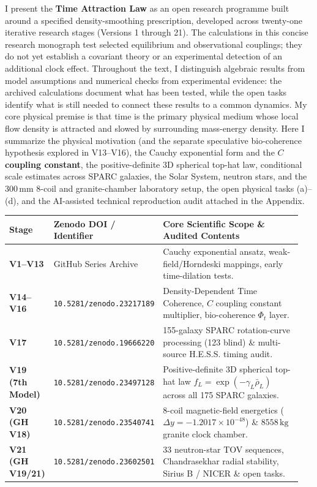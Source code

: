 \documentclass[10pt,a4paper]{article}
\begin{document}
{\small{}\par
I present the \textbf{Time Attraction Law} as an open research programme built around a specified density-smoothing prescription, developed across twenty-one iterative research stages (Versions 1 through 21). The calculations in this concise research monograph test selected equilibrium and observational couplings; they do not yet establish a covariant theory or an experimental detection of an additional clock effect. Throughout the text, I distinguish algebraic results from model assumptions and numerical checks from experimental evidence: the archived calculations document what has been tested, while the open tasks identify what is still needed to connect these results to a common dynamics. My core physical premise is that time is the primary physical medium whose local flow density is attracted and slowed by surrounding mass-energy density. Here I summarize the physical motivation (and the separate speculative bio-coherence hypothesis explored in V13--V16), the Cauchy exponential form and the \textbf{$C$ coupling constant}, the positive-definite 3D spherical top-hat law, conditional scale estimates across SPARC galaxies, the Solar System, neutron stars, and the $300\,\text{mm}$ 8-coil and granite-chamber laboratory setup, the open physical tasks (a)--(d), and the AI-assisted technical reproduction audit attached in the Appendix.

\vspace{1.5mm}
\begin{center}\vspace{-2pt}
{\footnotesize
\begin{tabular}{@{}>{\bfseries}p{0.15\linewidth}p{0.27\linewidth}p{0.53\linewidth}@{}}
\toprule
Stage & Zenodo DOI / Identifier & Core Scientific Scope \& Audited Contents \\
\midrule
V1--V13 & GitHub Series Archive & Cauchy exponential ansatz, weak-field/Horndeski mappings, early time-dilation tests. \\
V14--V16 & \texttt{10.5281/zenodo.23217189} & Density-Dependent Time Coherence, $C$ coupling constant multiplier, bio-coherence $\Phi_t$ layer. \\
V17 & \texttt{10.5281/zenodo.19666220} & 155-galaxy SPARC rotation-curve processing (123 blind) \& multi-source H.E.S.S. timing audit. \\
V19 (7th Model) & \texttt{10.5281/zenodo.23497128} & Positive-definite 3D spherical top-hat law $f_L=\exp(-\gamma_L\bar{\rho}_L)$ across all 175 SPARC galaxies. \\
V20 (GH V18) & \texttt{10.5281/zenodo.23540741} & 8-coil magnetic-field energetics ($\Delta y=-1.2017\times 10^{-48}$) \& $8558\,\text{kg}$ granite clock chamber. \\
V21 (GH V19/21) & \texttt{10.5281/zenodo.23602501} & 33 neutron-star TOV sequences, Chandrasekhar radial stability, Sirius B / NICER \& open tasks. \\
\bottomrule
\end{tabular}}
\end{center}

}
\end{document}
